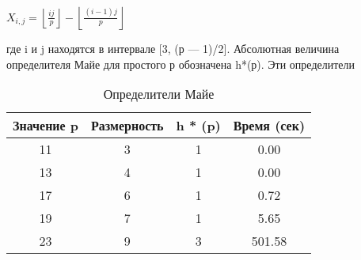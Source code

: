 \documentclass{../../template/mai_book}
\begin{document}
\begin{center}
\( X_{i,j} = \left\lfloor \frac{ij}{p} \right\rfloor - \left\lfloor \frac{(i-1)j}{p} \right\rfloor \)
\end{center}

где i и j находятся в интервале [3, (р — 1)/2]. Абсолютная величина
определителя Майе для простого р обозначена h*(р). Эти определители

\begin{wraptable}{l}{10cm}
\begin{tabular}{|c|c|c|c|}
\hline
Значение p & Размерность & h * (p) & Время (сек) \\ \hline
11 & 3 & 1 & 0.00 \\
13 & 4 & 1 & 0.00 \\
17 & 6 & 1 & 0.72 \\
19 & 7 & 1 & 5.65 \\
23 & 9 & 3 & 501.58 \\ \hline
\end{tabular}
\caption{Определители Майе}
\end{wraptable} 
\end{document}
